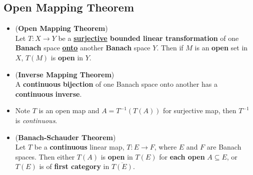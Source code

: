 \documentclass[11pt]{article}
\begin{document}
\subsection{Open Mapping Theorem}
\begin{itemize}
\item 
\begin{theorem} (\textbf{Open Mapping Theorem}) \citep{reed1980methods} \\
Let $T: X \rightarrow Y$ be a \textbf{\underline{surjective} bounded linear transformation} of one \textbf{Banach} space \underline{\textbf{onto}} another \textbf{Banach} space $Y$.  Then if $M$ is an \textbf{open} set in $X$, $T(M)$ is \textbf{open} in $Y$. 
\end{theorem}

\item \begin{corollary} (\textbf{Inverse Mapping Theorem}) \citep{reed1980methods} \\
A \textbf{continuous} \textbf{bijection} of one Banach space onto another has a \textbf{continuous} \textbf{inverse}. 
\end{corollary}

\item \begin{remark}
Note $T$ is an open map and $A = T^{-1}(T(A))$ for surjective map, then $T^{-1}$ is \emph{continuous}.
\end{remark}

\item \begin{theorem} (\textbf{Banach-Schauder Theorem}) \citep{reed1980methods}\\
Let $T$ be a \textbf{continuous} linear map, $T: E \rightarrow F$,  where $E$ and $F$ are Banach spaces. Then either $T(A)$ is \textbf{open} in $T(E)$  for \textbf{each open} $A \subseteq E$,  or $T(E)$  is of \textbf{first category} in $\overline{T(E)}$.
\end{theorem}
\end{itemize}
\end{document}
